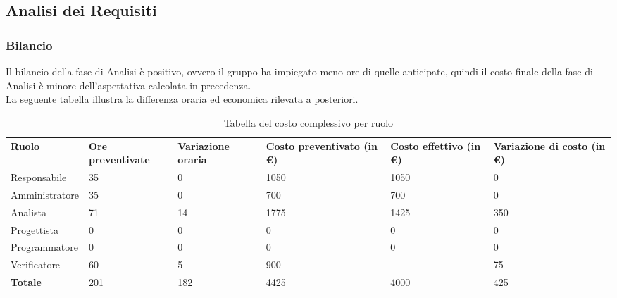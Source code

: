 \subsection{Analisi dei Requisiti}
\subsubsection{Bilancio}
Il bilancio della fase di Analisi è positivo, ovvero il gruppo ha impiegato meno ore di quelle anticipate, quindi il costo finale della fase di Analisi è minore dell'aspettativa calcolata in precedenza.\\
La seguente tabella illustra la differenza oraria ed economica rilevata a posteriori.

{
\renewcommand{\arraystretch}{2}
\begin{longtable}[h]{ C{2.5cm} C{2.5cm} C{2.5cm} C{2.5cm} C{1.5cm} C{2.5cm}}
\caption{Tabella del costo complessivo per ruolo}\\
\rowcolor{\primaryColor}

\textcolor{\secondaryColor}{\textbf{Ruolo}} & 
\textcolor{\secondaryColor}{\textbf{Ore preventivate}} & 
\textcolor{\secondaryColor}{\textbf{Variazione oraria}} & 
\textcolor{\secondaryColor}{\textbf{Costo preventivato (in \euro{})}} & 
\textcolor{\secondaryColor}{\textbf{Costo effettivo (in \euro{})}} & 
\textcolor{\secondaryColor}{\textbf{Variazione di costo (in \euro{})}}\\	
	
Responsabile    &  35 & 0 & 1050 & 1050 &  0 \\
Amministratore  &  35 & 0 & 700 & 700 & 0 \\
Analista        & 71 & 14 & 1775 & 1425 & 350 \\
Progettista     &   0 &   0 &    0 &  0 & 0 \\
Programmatore   &   0 &   0 &    0 &  0 & 0 \\
Verificatore    &  60 &  5 & 900 &  & 75 \\
\textbf{Totale} & 201 & 182 & 4425 & 4000 & 425 \\	

\end{longtable}
}

